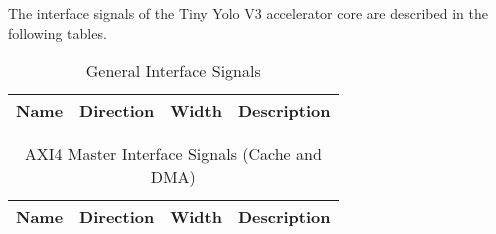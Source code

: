 \label{sec:is}

The interface signals of the Tiny Yolo V3 accelerator core are described in the 
following tables.

\begin{table}[H]
  \centering
  \begin{tabular}{|l|l|r|p{10.5cm}|}
    
    \hline
    \rowcolor{iob-green}
    {\bf Name} & {\bf Direction} & {\bf Width} & {\bf Description}  \\ \hline \hline

    
 
  \end{tabular}
  \caption{General Interface Signals}
  \label{gen_is_tab:is}
\end{table}

    

 
\clearpage

    

 

\begin{table}[H]
  \centering
  \begin{tabular}{|l|l|r|p{8.5cm}|}
    
    \hline
    \rowcolor{iob-green}
    {\bf Name} & {\bf Direction} & {\bf Width} & {\bf Description}  \\ \hline \hline

    
 
  \end{tabular}
  \caption{AXI4 Master Interface Signals (Cache and DMA)}
  \label{axi4_m_is_tab:is}
\end{table}


